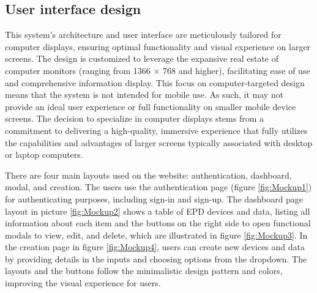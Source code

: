 \documentclass[../Main.tex]{subfiles}
\begin{document}
\subsection{User interface design}
This system's architecture and user interface are meticulously tailored for computer displays, ensuring optimal functionality and visual experience on larger screens. The design is customized to leverage the expansive real estate of computer monitors (ranging from 1366 \(\times\) 768 and higher), facilitating ease of use and comprehensive information display. This focus on computer-targeted design means that the system is not intended for mobile use. As such, it may not provide an ideal user experience or full functionality on smaller mobile device screens. The decision to specialize in computer displays stems from a commitment to delivering a high-quality, immersive experience that fully utilizes the capabilities and advantages of larger screens typically associated with desktop or laptop computers.

There are four main layouts used on the website: authentication, dashboard, modal, and creation. The users use the authentication page (figure \ref{fig:Mockup1}) for authenticating purposes, including sign-in and sign-up. The dashboard page layout in picture \ref{fig:Mockup2} shows a table of \gls{EPD} devices and data, listing all information about each item and the buttons on the right side to open functional modals to view, edit, and delete, which are illustrated in figure \ref{fig:Mockup3}. In the creation page in figure \ref{fig:Mockup4}, users can create new devices and data by providing details in the inputs and choosing options from the dropdown. The layouts and the buttons follow the minimalistic design pattern and colors, improving the visual experience for users.
\end{document}

